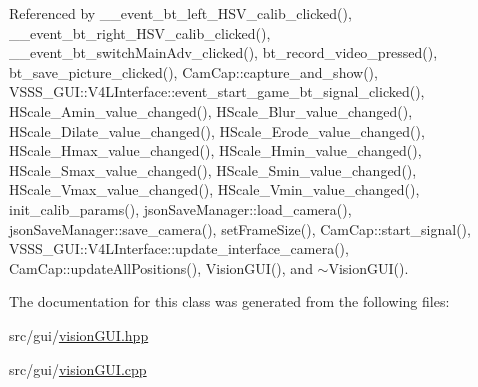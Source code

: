 Referenced by \+\_\+\+\_\+event\+\_\+bt\+\_\+left\+\_\+\+H\+S\+V\+\_\+calib\+\_\+clicked(), \+\_\+\+\_\+event\+\_\+bt\+\_\+right\+\_\+\+H\+S\+V\+\_\+calib\+\_\+clicked(), \+\_\+\+\_\+event\+\_\+bt\+\_\+switch\+Main\+Adv\+\_\+clicked(), bt\+\_\+record\+\_\+video\+\_\+pressed(), bt\+\_\+save\+\_\+picture\+\_\+clicked(), Cam\+Cap\+::capture\+\_\+and\+\_\+show(), V\+S\+S\+S\+\_\+\+G\+U\+I\+::\+V4\+L\+Interface\+::event\+\_\+start\+\_\+game\+\_\+bt\+\_\+signal\+\_\+clicked(), H\+Scale\+\_\+\+Amin\+\_\+value\+\_\+changed(), H\+Scale\+\_\+\+Blur\+\_\+value\+\_\+changed(), H\+Scale\+\_\+\+Dilate\+\_\+value\+\_\+changed(), H\+Scale\+\_\+\+Erode\+\_\+value\+\_\+changed(), H\+Scale\+\_\+\+Hmax\+\_\+value\+\_\+changed(), H\+Scale\+\_\+\+Hmin\+\_\+value\+\_\+changed(), H\+Scale\+\_\+\+Smax\+\_\+value\+\_\+changed(), H\+Scale\+\_\+\+Smin\+\_\+value\+\_\+changed(), H\+Scale\+\_\+\+Vmax\+\_\+value\+\_\+changed(), H\+Scale\+\_\+\+Vmin\+\_\+value\+\_\+changed(), init\+\_\+calib\+\_\+params(), json\+Save\+Manager\+::load\+\_\+camera(), json\+Save\+Manager\+::save\+\_\+camera(), set\+Frame\+Size(), Cam\+Cap\+::start\+\_\+signal(), V\+S\+S\+S\+\_\+\+G\+U\+I\+::\+V4\+L\+Interface\+::update\+\_\+interface\+\_\+camera(), Cam\+Cap\+::update\+All\+Positions(), Vision\+G\+U\+I(), and $\sim$\+Vision\+G\+U\+I().



The documentation for this class was generated from the following files\+:\begin{DoxyCompactItemize}
\item 
src/gui/\hyperlink{vision_g_u_i_8hpp}{vision\+G\+U\+I.\+hpp}\item 
src/gui/\hyperlink{vision_g_u_i_8cpp}{vision\+G\+U\+I.\+cpp}\end{DoxyCompactItemize}
